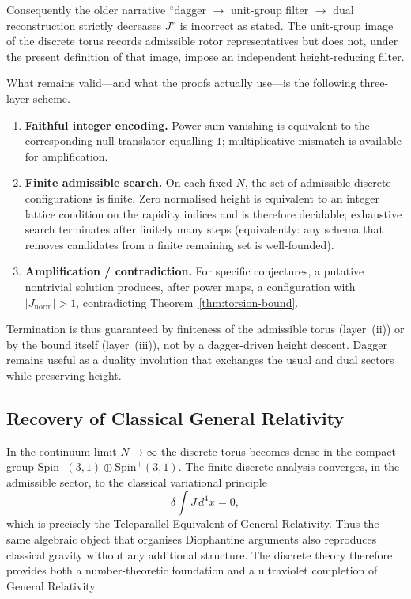 \documentclass[a4paper]{article}
\theoremstyle{definition}
\theoremstyle{remark}
\newcommand{\Jnorm}{J_{\mathrm{norm}}}
\begin{document}
Consequently the older narrative ``dagger \(\to\) unit-group filter \(\to\) dual reconstruction strictly decreases \(J\)'' is incorrect as stated. The unit-group image of the discrete torus records admissible rotor representatives but does not, under the present definition of that image, impose an independent height-reducing filter.

What remains valid---and what the proofs actually use---is the following three-layer scheme.

\begin{enumerate}[label=(\roman*)]
  \item \textbf{Faithful integer encoding.} Power-sum vanishing is equivalent to the corresponding null translator equalling \(1\); multiplicative mismatch is available for amplification.
  \item \textbf{Finite admissible search.} On each fixed \(N\), the set of admissible discrete configurations is finite. Zero normalised height is equivalent to an integer lattice condition on the rapidity indices and is therefore decidable; exhaustive search terminates after finitely many steps (equivalently: any schema that removes candidates from a finite remaining set is well-founded).
  \item \textbf{Amplification / contradiction.} For specific conjectures, a putative nontrivial solution produces, after power maps, a configuration with \(|\Jnorm|>1\), contradicting Theorem~\ref{thm:torsion-bound}.
\end{enumerate}

Termination is thus guaranteed by finiteness of the admissible torus (layer~(ii)) or by the bound itself (layer~(iii)), not by a dagger-driven height descent. Dagger remains useful as a duality involution that exchanges the usual and dual sectors while preserving height.

\subsection{Recovery of Classical General Relativity}

In the continuum limit \( N \to \infty \) the discrete torus becomes dense in the compact group \( \mathrm{Spin}^+(3,1) \oplus \mathrm{Spin}^+(3,1) \). The finite discrete analysis converges, in the admissible sector, to the classical variational principle
\[
\delta \int J \, d^4x = 0,
\]
which is precisely the Teleparallel Equivalent of General Relativity. Thus the same algebraic object that organises Diophantine arguments also reproduces classical gravity without any additional structure. The discrete theory therefore provides both a number-theoretic foundation and a ultraviolet completion of General Relativity.
\end{document}
